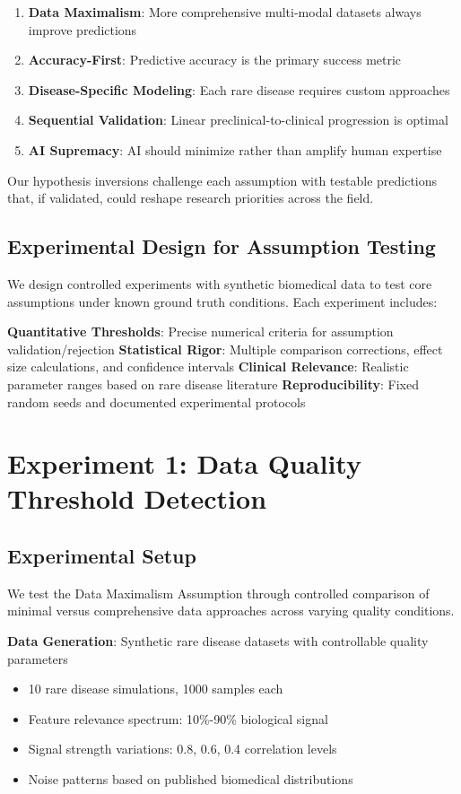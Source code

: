 \documentclass{article}
\begin{document}
\begin{enumerate}
    \item \textbf{Data Maximalism}: More comprehensive multi-modal datasets always improve predictions
    \item \textbf{Accuracy-First}: Predictive accuracy is the primary success metric
    \item \textbf{Disease-Specific Modeling}: Each rare disease requires custom approaches  
    \item \textbf{Sequential Validation}: Linear preclinical-to-clinical progression is optimal
    \item \textbf{AI Supremacy}: AI should minimize rather than amplify human expertise
\end{enumerate}

Our hypothesis inversions challenge each assumption with testable predictions that, if validated, could reshape research priorities across the field.

\subsection{Experimental Design for Assumption Testing}

We design controlled experiments with synthetic biomedical data to test core assumptions under known ground truth conditions. Each experiment includes:

\textbf{Quantitative Thresholds}: Precise numerical criteria for assumption validation/rejection
\textbf{Statistical Rigor}: Multiple comparison corrections, effect size calculations, and confidence intervals
\textbf{Clinical Relevance}: Realistic parameter ranges based on rare disease literature
\textbf{Reproducibility}: Fixed random seeds and documented experimental protocols

\section{Experiment 1: Data Quality Threshold Detection}

\subsection{Experimental Setup}

We test the Data Maximalism Assumption through controlled comparison of minimal versus comprehensive data approaches across varying quality conditions.

\textbf{Data Generation}: Synthetic rare disease datasets with controllable quality parameters
\begin{itemize}
    \item 10 rare disease simulations, 1000 samples each
    \item Feature relevance spectrum: 10\%-90\% biological signal
    \item Signal strength variations: 0.8, 0.6, 0.4 correlation levels
    \item Noise patterns based on published biomedical distributions
\end{itemize}
\end{document}
